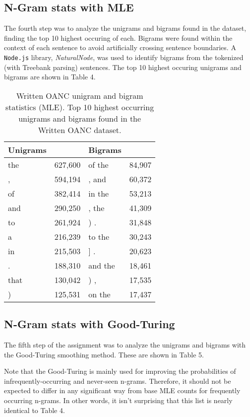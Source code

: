 \documentclass[11pt]{article}
\begin{document}
\subsection{N-Gram stats with MLE}
The fourth step was to analyze the unigrams and bigrams found in the dataset,
finding the top 10 highest occuring of each.  Bigrams were found within the
context of each sentence to avoid artificially crossing sentence boundaries.
A {\tt Node.js} library, {\em NaturalNode}, was used to identify bigrams from
the tokenized (with Treebank parsing) sentences. The top 10 highest occuring
unigrams and bigrams are shown in Table 4.

\begin{table}[h]
\begin{center}
\begin{tabular}{|lr|lr|}
\hline \bf Unigrams & & \bf Bigrams & \\ \hline
the & 627,600    & of the & 84,907 \\
, & 594,194      & , and & 60,372 \\
of & 382,414     & in the & 53,213 \\
and & 290,250    & , the & 41,309 \\
to & 261,924     & ) . & 31,848 \\
a & 216,239      & to the & 30,243 \\
in & 215,503     & ] . & 20,623 \\
. & 188,310      & and the & 18,461 \\
that & 130,042   & ) , & 17,535 \\
) & 125,531      & on the & 17,437 \\
\hline
\end{tabular}
\end{center}
\caption{\label{tokenStats} Written OANC unigram and bigram statistics (MLE).
Top 10 highest occurring unigrams and bigrams found in the Written OANC dataset.}
\end{table}

\subsection{N-Gram stats with Good-Turing}
The fifth step of the assignment was to analyze the unigrams and bigrams with the
Good-Turing smoothing method. These are shown in Table 5.

Note that the Good-Turing is mainly used for improving
the probabilities of infrequently-occurring and never-seen n-grams.  Therefore, it
should not be expected to differ in any significant way from base MLE counts for
frequently occurring n-grams.  In other words, it isn't surprising that this list
is nearly identical to Table 4.
\end{document}
